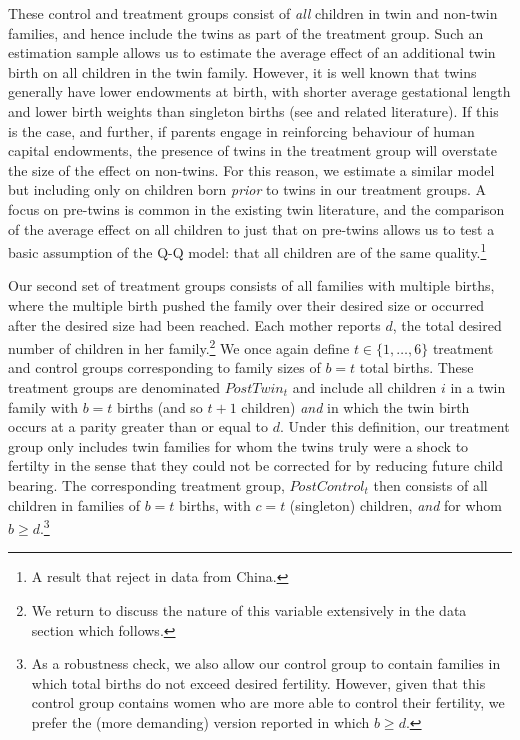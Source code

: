 \documentclass{article}[12pt,subeqn]
\begin{document}
\begin{spacing}{1.5}
These control and treatment groups consist of \emph{all} children in twin and non-twin families, and hence include the twins as part of the treatment group.  Such an estimation sample allows us to estimate the average effect of an additional twin birth on all children in the twin family.  However, it is well known that twins generally have lower endowments at birth, with shorter average gestational length and lower birth weights than singleton births (see \citet{Hall2003} and related literature).  If this is the case, and further, if parents engage in reinforcing behaviour of human capital endowments, the presence of twins in the treatment group will overstate the size of the effect on non-twins.  For this reason, we estimate a similar model but including only on children born \emph{prior} to twins in our treatment groups.  A focus on pre-twins is common in the existing twin literature, and the comparison of the average effect on all children to just that on pre-twins allows us to test a basic assumption of the Q-Q model: that all children are of the same quality.\footnote{A result that \citet{RosenzweigZhang2009} reject in data from China.} 
 
Our second set of treatment groups consists of all families with multiple births, where the multiple birth pushed the family over their desired size or occurred after the desired size had been reached.  Each mother reports $d$, the total desired number of children in her family.\footnote{We return to discuss the nature of this variable extensively in the data section which follows.}  We once again define $t\in\{1,\ldots,6\}$ treatment and control groups corresponding to family sizes of $b=t$ total births.  These treatment groups are denominated $PostTwin_t$ and include all children $i$ in a twin family with $b=t$ births (and so $t+1$ children) \emph{and} in which the twin birth occurs at a parity greater than or equal to $d$.  Under this definition, our treatment group only includes twin families for whom the twins truly were a shock to fertilty in the sense that they could not be corrected for by reducing future child bearing.  The corresponding treatment group, $PostControl_t$ then consists of all children in families of $b=t$ births, with $c=t$ (singleton) children, \emph{and} for whom $b\geq d$.\footnote{As a robustness check, we also allow our control group to contain families in which total births do not exceed desired fertility.  However, given that this control group contains women who are more able to control their fertility, we prefer the (more demanding) version reported in which $b\geq d$.}


\end{spacing}
\end{document}
